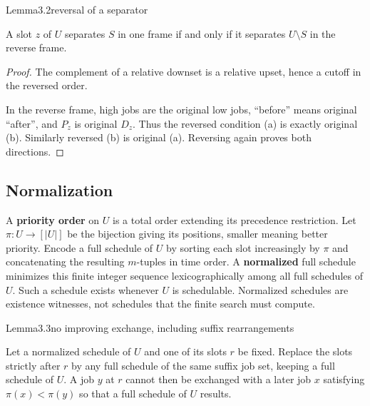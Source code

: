 \begin{numbered}{Lemma}{3.2}{reversal of a separator}

A slot \(z\) of \(U\) separates \(S\) in one frame if and only if it separates \(U\setminus S\) in the reverse frame.

\end{numbered}

\begin{proof}
The complement of a relative downset is a relative upset, hence a cutoff in the reversed order.

In the reverse frame, high jobs are the original low jobs, ``before'' means original ``after'', and \(P_z\) is original \(D_z\). Thus the reversed condition (a) is exactly original (b). Similarly reversed (b) is original (a). Reversing again proves both directions.
\end{proof}

\subsection{Normalization}

A \textbf{priority order} on \(U\) is a total order extending its precedence restriction. Let \(\pi:U\to[|U|]\) be the bijection giving its positions, smaller meaning better priority. Encode a full schedule of \(U\) by sorting each slot increasingly by \(\pi\) and concatenating the resulting \(m\)-tuples in time order. A \textbf{normalized} full schedule minimizes this finite integer sequence lexicographically among all full schedules of \(U\). Such a schedule exists whenever \(U\) is schedulable. Normalized schedules are existence witnesses, not schedules that the finite search must compute.

\begin{numbered}{Lemma}{3.3}{no improving exchange, including suffix rearrangements}

Let a normalized schedule of \(U\) and one of its slots \(r\) be fixed. Replace the slots strictly after \(r\) by any full schedule of the same suffix job set, keeping a full schedule of \(U\). A job \(y\) at \(r\) cannot then be exchanged with a later job \(x\) satisfying \(\pi(x)<\pi(y)\) so that a full schedule of \(U\) results.

\end{numbered}

